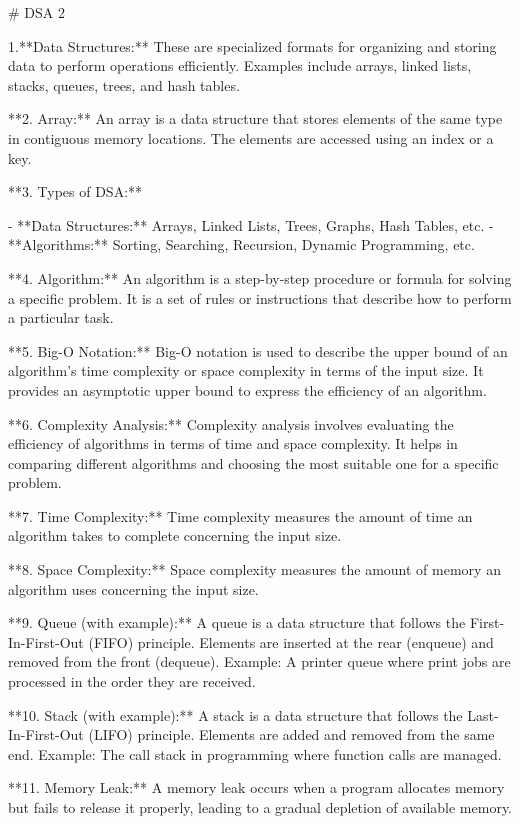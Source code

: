 # DSA 2

1.**Data Structures:** These are specialized formats for organizing and storing data to perform operations efficiently. Examples include arrays, linked lists, stacks, queues, trees, and hash tables.

**2. Array:** An array is a data structure that stores elements of the same type in contiguous memory locations. The elements are accessed using an index or a key.

**3. Types of DSA:**

- **Data Structures:** Arrays, Linked Lists, Trees, Graphs, Hash Tables, etc.
- **Algorithms:** Sorting, Searching, Recursion, Dynamic Programming, etc.

**4. Algorithm:** An algorithm is a step-by-step procedure or formula for solving a specific problem. It is a set of rules or instructions that describe how to perform a particular task.

**5. Big-O Notation:** Big-O notation is used to describe the upper bound of an algorithm's time complexity or space complexity in terms of the input size. It provides an asymptotic upper bound to express the efficiency of an algorithm.

**6. Complexity Analysis:** Complexity analysis involves evaluating the efficiency of algorithms in terms of time and space complexity. It helps in comparing different algorithms and choosing the most suitable one for a specific problem.

**7. Time Complexity:** Time complexity measures the amount of time an algorithm takes to complete concerning the input size.

**8. Space Complexity:** Space complexity measures the amount of memory an algorithm uses concerning the input size.

**9. Queue (with example):** A queue is a data structure that follows the First-In-First-Out (FIFO) principle. Elements are inserted at the rear (enqueue) and removed from the front (dequeue). Example: A printer queue where print jobs are processed in the order they are received.

**10. Stack (with example):** A stack is a data structure that follows the Last-In-First-Out (LIFO) principle. Elements are added and removed from the same end. Example: The call stack in programming where function calls are managed.

**11. Memory Leak:** A memory leak occurs when a program allocates memory but fails to release it properly, leading to a gradual depletion of available memory.

